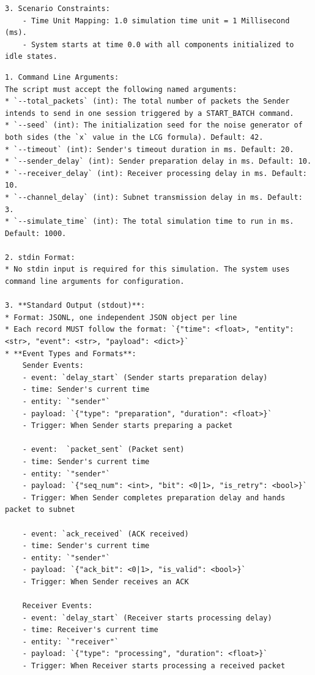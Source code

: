 \begin{lstlisting}[caption={Behavioral Specification}]
3. Scenario Constraints:
    - Time Unit Mapping: 1.0 simulation time unit = 1 Millisecond (ms).
    - System starts at time 0.0 with all components initialized to idle states.
\end{lstlisting}
\begin{lstlisting}[caption={Operational Specification}]
1. Command Line Arguments:
The script must accept the following named arguments:
* `--total_packets` (int): The total number of packets the Sender intends to send in one session triggered by a START_BATCH command. 
* `--seed` (int): The initialization seed for the noise generator of both sides (the `x` value in the LCG formula). Default: 42.
* `--timeout` (int): Sender's timeout duration in ms. Default: 20.
* `--sender_delay` (int): Sender preparation delay in ms. Default: 10.
* `--receiver_delay` (int): Receiver processing delay in ms. Default: 10.
* `--channel_delay` (int): Subnet transmission delay in ms. Default: 3.
* `--simulate_time` (int): The total simulation time to run in ms. Default: 1000.

2. stdin Format:
* No stdin input is required for this simulation. The system uses command line arguments for configuration.

3. **Standard Output (stdout)**:
* Format: JSONL, one independent JSON object per line
* Each record MUST follow the format: `{"time": <float>, "entity": <str>, "event": <str>, "payload": <dict>}`
* **Event Types and Formats**:
    Sender Events:
    - event: `delay_start` (Sender starts preparation delay)
    - time: Sender's current time
    - entity: `"sender"`
    - payload: `{"type": "preparation", "duration": <float>}`
    - Trigger: When Sender starts preparing a packet
    
    - event:  `packet_sent` (Packet sent)
    - time: Sender's current time
    - entity: `"sender"`
    - payload: `{"seq_num": <int>, "bit": <0|1>, "is_retry": <bool>}`
    - Trigger: When Sender completes preparation delay and hands packet to subnet
    
    - event: `ack_received` (ACK received)
    - time: Sender's current time
    - entity: `"sender"`
    - payload: `{"ack_bit": <0|1>, "is_valid": <bool>}`
    - Trigger: When Sender receives an ACK
    
    Receiver Events:
    - event: `delay_start` (Receiver starts processing delay)
    - time: Receiver's current time
    - entity: `"receiver"`
    - payload: `{"type": "processing", "duration": <float>}`
    - Trigger: When Receiver starts processing a received packet
    

\end{lstlisting}
